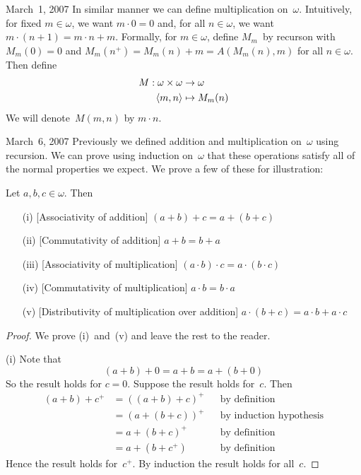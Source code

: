 \begin{lecture}{March~1, 2007}
In similar manner we can define multiplication on~\(\omega\). Intuitively, for fixed \(m\in\omega\), we want \(m\cdot 0=0\) and, for all \(n\in\omega\), we want \(m\cdot(n+1)=m\cdot n+m\). Formally, for \(m\in\omega\), define \(M_m\)~by recurson with \(M_m(0)=0\) and \(M_m(n^+)=M_m(n)+m=A(M_m(n),m)\) for all \(n\in\omega\). Then define
\begin{align*}
M:\omega\times\omega&\to\omega\\
	\langle{m},{n}\rangle&\mapsto M_m(n)
\end{align*}
We will denote~\(M(m,n)\) by \(m\cdot n\).
\end{lecture}

\begin{lecture}{March~6, 2007}
Previously we defined addition and multiplication on~\(\omega\) using recursion. We can prove using induction on~\(\omega\) that these operations satisfy all of the normal properties we expect. We prove a few of these for illustration:
\begin{thm}
Let \(a,b,c\in\omega\). Then
\begin{enumerate}[itemsep=0pt]
\item[(i)] [Associativity of addition] \((a+b)+c=a+(b+c)\)
\item[(ii)] [Commutativity of addition] \(a+b=b+a\)
\item[(iii)] [Associativity of multiplication] \((a\cdot b)\cdot c=a\cdot(b\cdot c)\)
\item[(iv)] [Commutativity of multiplication] \(a\cdot b=b\cdot a\)
\item[(v)] [Distributivity of multiplication over addition] \(a\cdot(b+c)=a\cdot b+a\cdot c\)
\end{enumerate}
\end{thm}
\begin{proof}
We prove (i)~and~(v) and leave the rest to the reader.

(i) Note that
\[(a+b)+0=a+b=a+(b+0)\]
So the result holds for \(c=0\). Suppose the result holds for~\(c\). Then
\begin{align*}
(a+b)+c^+&=((a+b)+c)^+&&\text{by definition}\\
	&=(a+(b+c))^+&&\text{by induction hypothesis}\\
	&=a+(b+c)^+&&\text{by definition}\\
	&=a+(b+c^+)&&\text{by definition}
\end{align*}
Hence the result holds for~\(c^+\). By induction the result holds for all~\(c\).


\end{proof}
\end{lecture}
